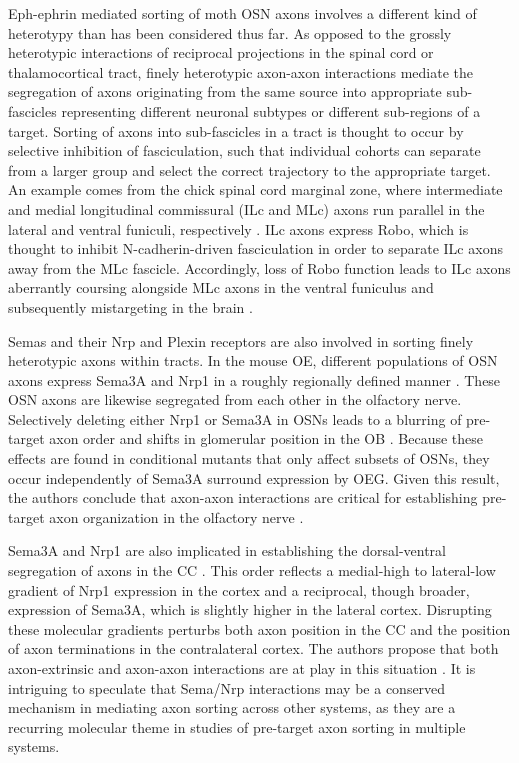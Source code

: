 Eph-ephrin mediated sorting of moth OSN axons involves a different kind of heterotypy than has been considered thus far.
As opposed to the grossly heterotypic interactions of reciprocal projections in the spinal cord or thalamocortical tract, finely heterotypic axon-axon interactions mediate the segregation of axons originating from the same source into appropriate sub-fascicles representing different neuronal subtypes or different sub-regions of a target.
Sorting of axons into sub-fascicles in a tract is thought to occur by selective inhibition of fasciculation, such that individual cohorts can separate from a larger group and select the correct trajectory to the appropriate target.
An example comes from the chick spinal cord marginal zone, where intermediate and medial longitudinal commissural (ILc and MLc) axons run parallel in the lateral and ventral funiculi, respectively \cite{sakai2012axon}.
ILc axons express Robo, which is thought to inhibit N-cadherin-driven fasciculation in order to separate ILc axons away from the MLc fascicle.
Accordingly, loss of Robo function leads to ILc axons aberrantly coursing alongside MLc axons in the ventral funiculus and subsequently mistargeting in the brain \cite{sakai2012axon}.

Semas and their Nrp and Plexin receptors are also involved in sorting finely heterotypic axons within tracts.
In the mouse OE, different populations of OSN axons express Sema3A and Nrp1 in a roughly regionally defined manner \cite{imai2009pre}.
These OSN axons are likewise segregated from each other in the olfactory nerve. 
Selectively deleting either Nrp1 or Sema3A in OSNs leads to a blurring of pre-target axon order and shifts in glomerular position in the OB \cite{imai2009pre}.
Because these effects are found in conditional mutants that only affect subsets of OSNs, they occur independently of Sema3A surround expression by OEG.
Given this result, the authors conclude that axon-axon interactions are critical for establishing pre-target axon organization in the olfactory nerve \cite{imai2009pre}.

Sema3A and Nrp1 are also implicated in establishing the dorsal-ventral segregation of axons in the CC \cite{zhou2013axon}.
This order reflects a medial-high to lateral-low gradient of Nrp1 expression in the cortex and a reciprocal, though broader, expression of Sema3A, which is slightly higher in the lateral cortex.
Disrupting these molecular gradients perturbs both axon position in the CC and the position of axon terminations in the contralateral cortex.
The authors propose that both axon-extrinsic and axon-axon interactions are at play in this situation \cite{zhou2013axon}.
It is intriguing to speculate that Sema/Nrp interactions may be a conserved mechanism in mediating axon sorting across other systems, as they are a recurring molecular theme in studies of pre-target axon sorting in multiple systems.